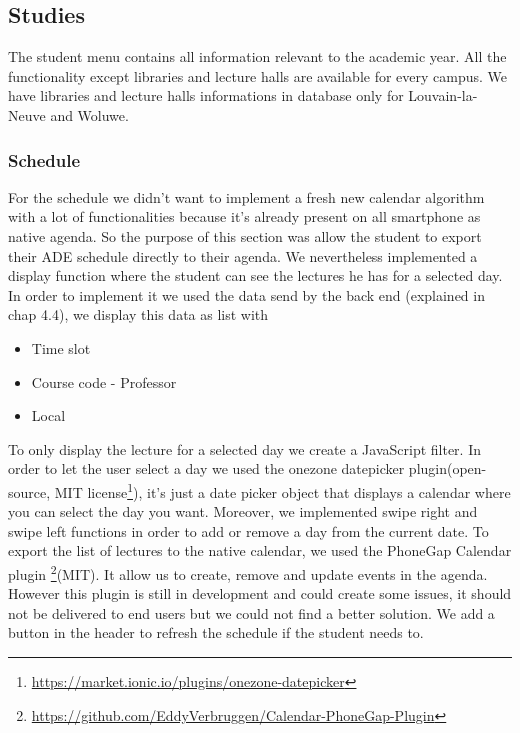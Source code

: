 \documentclass{eplmastersthesis}
\begin{document}
\subsection{Studies}
The student menu contains all information relevant to the academic year. All the functionality except libraries and lecture halls are available for every campus. We have libraries and lecture halls informations in database only for Louvain-la-Neuve and Woluwe. 
\subsubsection{Schedule}
For the schedule we didn't want to implement a fresh new calendar algorithm with a lot of functionalities because it's already present on all smartphone as native agenda. So the purpose of this section was allow the student to export their ADE schedule directly to their agenda. We nevertheless implemented a display function where the student can see the lectures he has for a selected day. In order to implement it we used the data send by the back end (explained in chap 4.4), we display this data as list with
\begin{itemize}
\item Time slot
\item Course code - Professor
\item Local
\end{itemize}
To only display the lecture for a selected day we create a JavaScript filter. In order to let the user select a day we used the onezone datepicker plugin(open-source, MIT license\footnote{\url{https://market.ionic.io/plugins/onezone-datepicker}}), it's just a date picker object that displays a calendar where you can select the day you want. Moreover, we implemented swipe right and swipe left functions in order to add or remove a day from the current date.
To export the list of lectures to the native calendar, we used the PhoneGap Calendar plugin \footnote{\url{https://github.com/EddyVerbruggen/Calendar-PhoneGap-Plugin}}(MIT). It allow us to create, remove and update events in the agenda. However this plugin is still in development and could create some issues, it should not be delivered to end users but we could not find a better solution. We add a button in the header to refresh the schedule if the student needs to. 
\end{document}
